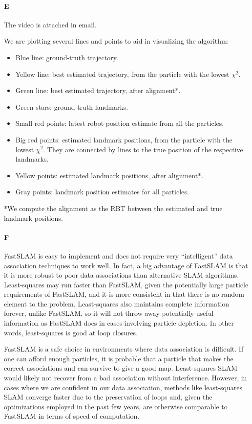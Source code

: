 \documentclass[12pt]{article}
\begin{document}
\paragraph{E}
The video is attached in email.

We are plotting several lines and points to aid in visualizing the algorithm:
\begin{itemize}
	\item Blue line: ground-truth trajectory.
	\item Yellow line: best estimated trajectory, from the particle with the lowest $\chi^2$.
	\item Green line: best estimated trajectory, after alignment*.
	\item Green stars: ground-truth landmarks.
	\item Small red points: latest robot position estimate from all the particles.
	\item Big red points: estimated landmark positions, from the particle with the lowest $\chi^2$. They are connected by lines to the true position of the respective landmarks.
	\item Yellow points: estimated landmark positions, after alignment*.
	\item Gray points: landmark position estimates for all particles.
\end{itemize}

*We compute the alignment as the RBT between the estimated and true landmark positions.

\paragraph{F}
FastSLAM is easy to implement and does not require very ``intelligent'' data
association techniques to work well. In fact, a big advantage of FastSLAM is
that it is more robust to poor data associations than alternative SLAM
algorithms. Least-squares may run faster than FastSLAM, given the potentially
large particle requirements of FastSLAM, and it is more consistent in that
there is no random element to the problem. Least-squares also maintains
complete information forever, unlike FastSLAM, so it will not throw away
potentially useful information as FastSLAM does in cases involving particle
depletion. In other words, least-squares is good at loop closures.

FastSLAM is a safe choice in environments where data association is difficult.
If one can afford enough particles, it is probable that a particle that makes
the correct associations and can survive to give a good map. Least-squares SLAM
would likely not recover from a bad association without interference. However,
in cases where we are confident in our data association, methods like
least-squares SLAM converge faster due to the preservation of loops and, given
the optimizations employed in the past few years, are otherwise comparable to
FastSLAM in terms of speed of computation.
\end{document}
